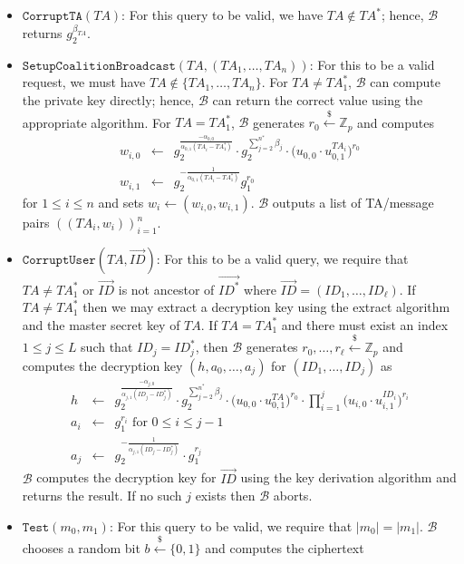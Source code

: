 \documentclass{llncs}
\newcommand{\B}{\mathcal{B}}
\newcommand{\Zbb}{\mathbb{Z}}
\newcommand{\ID}{\mathit{ID}}
\newcommand{\TA}{\mathit{TA}}
\newcommand{\getsr}{\stackrel{{\scriptscriptstyle\$}}{\gets}}
\begin{document}
\begin{enumerate}
\begin{itemize}
    \item $\texttt{CorruptTA}(\TA)$: For this query to be valid, we have $\TA \notin \TA^{*}$; hence, $\B$ returns $g_{2}^{\beta_{\TA}}$.
    \item $\texttt{SetupCoalitionBroadcast}(\TA,(\TA_{1},\ldots,\TA_{n}))$: For this to be a valid request, we must have $\TA\notin \{\TA_{1},\ldots,\TA_{n}\}$. For $\TA \neq \TA^{*}_{1}$, $\B$ can compute the private key directly; hence, $\B$ can return the correct value using the appropriate algorithm. For $\TA=\TA^{*}_{1}$, $\B$ generates $r_{0}\getsr \Zbb_{p}$ and computes
        \begin{eqnarray*}
        w_{i,0} &\gets& g_{2}^{\frac{-\alpha_{0,0}}{\alpha_{0,1}(\TA_{i}-\TA^{*}_{1})}} \cdot g_{2}^{\sum_{j=2}^{n^{*}}\beta_{j}} \cdot \Big( u_{0,0} \cdot u_{0,1}^{\TA_{i}} \Big)^{r_{0}}\\
        w_{i,1} &\gets& g_{2}^{-\frac{1}{\alpha_{0,1}(\TA_{i}-\TA^{*}_{1})}}g_{1}^{r_{0}}
        \end{eqnarray*}
        for $1\leq i\leq n$ and sets $w_{i}\gets (w_{i,0},w_{i,1})$. $\B$ outputs a list of TA/message pairs $((\TA_{i},w_{i}))_{i=1}^{n}$.
    \item $\texttt{CorruptUser}(\TA,\vec{\ID})$: For this to be a valid query, we require that $\TA\neq \TA^{*}_{1}$ or $\vec{\ID}$ is not ancestor of $\vec{\ID^{*}}$ where $\vec{\ID}=(\ID_{1},\ldots,\ID_{\ell})$. If $\TA\neq \TA^{*}_{1}$ then we may extract a decryption key using the extract algorithm and the master secret key of $\TA$. If $\TA=\TA^{*}_{1}$ and there must exist an index $1\leq j\leq L$ such that $\ID_{j} = \ID^{*}_{j}$, then $\B$ generates $r_{0},\ldots,r_{\ell}\getsr \Zbb_{p}$ and computes the decryption key $(h,a_{0},\ldots,a_{j})$ for $(\ID_{1},\ldots,\ID_{j})$ as
        \begin{eqnarray*}
        h &\gets& g_{2}^{\frac{-\alpha_{j,0}}{\alpha_{j,1}(\ID_{j}-\ID^{*}_{j})}} \cdot g_{2}^{\sum_{j=2}^{n^{*}}\beta_{j}}\cdot \Big(u_{0,0}\cdot u_{0,1}^{\TA}\Big)^{r_{0}} \cdot \prod_{i=1}^{j} \Big(u_{i,0}\cdot u_{i,1}^{\ID_{i}}\Big)^{r_{i}}\\
        a_{i} &\gets& g_{1}^{r_{i}} \mbox{ for } 0\leq i\leq j-1\\
        a_{j} &\gets& g_{2}^{-\frac{1}{\alpha_{j,1}(\ID_{j}-\ID^{*}_{j})}} \cdot g_{1}^{r_{j}}
        \end{eqnarray*}
        $\B$ computes the decryption key for $\vec{\ID}$ using the key derivation algorithm and returns the result. If no such $j$ exists then $\B$ aborts.
    \item $\texttt{Test}(m_{0},m_{1})$: For this query to be valid, we require that $|m_{0}|=|m_{1}|$. $\B$ chooses a random bit $b\getsr \{0,1\}$ and computes the ciphertext 

\end{itemize}
\end{enumerate}
\end{document}
